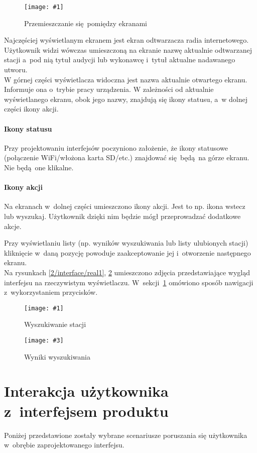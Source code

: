 \documentclass[polish]{aghengthesis}
\newcommand{\imgint}[4]{
	\begin{figure}[{#4}]
		\centering
		\texttt{[image: \#1]}
		\caption{#2}
		\label{#1}
	\end{figure}
}
\newcommand{\imgh}[3]{\imgint{#1}{#2}{#3}{H}}
\newcommand{\imgintss}[5]{
	\begin{figure}[{#5}]
		\centering
		\begin{minipage}{.45\textwidth}
			\centering
			\texttt{[image: \#1]}
			\caption{#2}
			\label{#1}
		\end{minipage}%
		\hfill
		\begin{minipage}{.45\textwidth}
			\centering
			\texttt{[image: \#3]}
			\caption{#4}
			\label{#3}
		\end{minipage}
	\end{figure}
}
\newcommand{\imghss}[4]{\imgintss{#1}{#2}{#3}{#4}{H}}
\begin{document}
		\imgh{2/interface/all}{Przemieszczanie się pomiędzy ekranami}{0.9}
		
		Najczęściej wyświetlanym ekranem jest ekran odtwarzacza radia internetowego. Użytkownik widzi wówczas umieszczoną na ekranie nazwę aktualnie odtwarzanej stacji a~pod nią tytuł audycji lub wykonawcę i~tytuł aktualne nadawanego utworu.
		$ $\\
		
		W górnej części wyświetlacza widoczna jest nazwa aktualnie otwartego ekranu. Informuje ona o~trybie pracy urządzenia.
		W zależności od aktualnie wyświetlanego ekranu, obok jego nazwy, znajdują się ikony statusu, a~w dolnej części ikony akcji.
		
		\paragraph{Ikony statusu}
			Przy projektowaniu interfejsów poczyniono założenie, że ikony statusowe (połączenie WiFi/włożona karta SD/etc.) znajdować się będą na górze ekranu. Nie będą one klikalne.
			
		\paragraph{Ikony akcji}
			Na ekranach w~dolnej części umieszczono ikony akcji. Jest to np. ikona wstecz lub wyszukaj. Użytkownik dzięki nim będzie mógł przeprowadzać dodatkowe akcje.
		
		$ $\\
		Przy wyświetlaniu listy (np. wyników wyszukiwania lub listy ulubionych stacji) kliknięcie w~daną pozycję powoduje zaakceptowanie jej i~otworzenie następnego ekranu.
		$ $\\
		
		Na rysunkach \ref{2/interface/real1}, \ref{2/interface/real2} umieszczono zdjęcia przedstawiające wygląd interfejsu na rzeczywistym wyświetlaczu. W~sekcji~\ref{sec:uinav} omówiono sposób nawigacji z~wykorzystaniem przycisków.
		\imghss{2/interface/real1}{Wyszukiwanie stacji}{2/interface/real2}{Wyniki wyszukiwania}
	
	\section{Interakcja użytkownika z~interfejsem produktu}
		\label{sec:uinav}
		Poniżej przedstawione zostały wybrane scenariusze poruszania się użytkownika w~obrębie zaprojektowanego interfejsu.
		$ $\\
		
\end{document}
